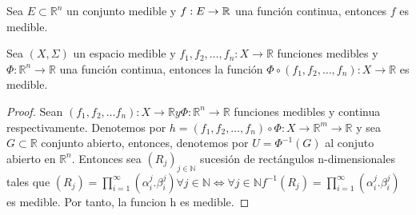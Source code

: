 \begin{corolario}
    Sea $E \subset \mathbb{R}^n$ un conjunto medible y $f: E \to \mathbb{R}$ una función continua, entonces $f$ es medible.
\end{corolario}

\begin{proposición}
    Sea $(X, \Sigma)$ un espacio medible y $f_1, f_2, \dots, f_n: X \to \mathbb{R}$ funciones medibles y $\Phi: \mathbb{R}^n \to \mathbb{R}$ una función continua, entonces la función $\Phi \circ (f_1, f_2, \dots, f_n): X \to \mathbb{R}$ es medible.
\end{proposición}

\begin{proof}
    Sean $(f_1, f_2, \dots f_n): X \to \mathbb{R} y \Phi: \mathbb{R}^n \to \mathbb{R}$ funciones medibles y continua respectivamente. Denotemos por $h = (f_1, f_2, \dots, f_n) \circ \Phi: X \to \mathbb{R}^m \to \mathbb{R}$ y sea $G \subset \mathbb{R}$ conjunto abierto, entonces, denotemos por $U = \Phi^{-1}(G)$ al conjuto abierto en $\mathbb{R}^n$. Entonces sea $(R_j)_{j\in\mathbb{N}}$ sucesión de rectángulos n-dimensionales tales que $(R_j) = \prod_{i = 1}^{\infty}(\alpha_i^{j}. \beta_i^{j}) \forall j \in \mathbb{N} \iff \forall j \in \mathbb{N} f^{-1}(R_j) = \prod_{i = 1}^{\infty}(\alpha_i^{j}. \beta_i^{j})$ es medible. Por tanto, la funcion h es medible. 
\end{proof}

